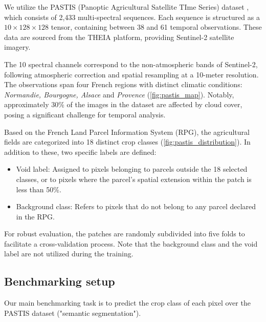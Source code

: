 \documentclass[11pt]{article}
\begin{document}
We utilize the PASTIS (Panoptic Agricultural Satellite TIme
Series) dataset \cite{garnot2022panopticsegmentationsatelliteimage},
which consists of 2,433
multi-spectral sequences. Each sequence is structured as a $10 \times
128 \times 128$ tensor, containing between 38 and 61 temporal
observations. These data are sourced from the THEIA
platform, providing Sentinel-2 satellite imagery.

The 10 spectral channels correspond to the non-atmospheric bands of
Sentinel-2, following atmospheric correction and spatial resampling
at a 10-meter resolution. The observations span four French regions
with distinct climatic conditions: \textit{Normandie, Bourgogne,
Alsace} and \textit{Provence} (\autoref{fig:pastis_map}). Notably,
approximately 30\% of the
images in the dataset are affected by cloud cover, posing a
significant challenge for temporal analysis.

Based on the French Land Parcel Information System (RPG), the
agricultural fields are categorized into 18 distinct crop
classes (\autoref{fig:pastis_distribution}). In addition to these,
two specific labels are defined:
\begin{itemize}
  \item Void label: Assigned to pixels belonging to parcels
    outside the 18 selected classes, or to pixels where the parcel's
    spatial extension within the patch is less than 50\%.
  \item Background class: Refers to pixels that do not
    belong to any parcel declared in the RPG.
\end{itemize}

For robust evaluation, the patches are randomly subdivided into
five folds to facilitate a cross-validation process. Note
that the background class and the void label are not utilized during
the training.

\subsection{Benchmarking setup}

Our main benchmarking task is to predict the crop class of each pixel
over the PASTIS dataset ("semantic segmentation").
\end{document}
